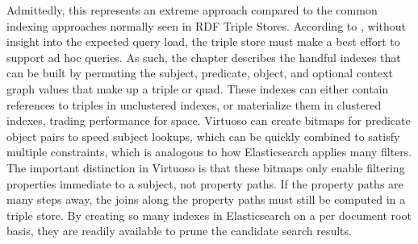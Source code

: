 Admittedly, this represents an extreme approach compared to the common indexing approaches normally seen in RDF Triple Stores.  
According to \cite{luo2012storing}, without insight into the expected query load, the triple store must make a best effort to support ad hoc queries.  
As such, the chapter describes the handful indexes that can be built by permuting the subject, predicate, object, and optional context graph values that make up a triple or quad.
These indexes can either contain references to triples in unclustered indexes, or materialize them in clustered indexes, trading performance for space.
Virtuoso can create bitmaps for predicate object pairs to speed subject lookups, which can be quickly combined to satisfy multiple constraints, which is analogous to how Elasticsearch applies many filters. 
The important distinction in Virtuoso is that these bitmaps only enable filtering properties immediate to a subject, not property paths.
If the property paths are many steps away, the joins along the property paths must still be computed in a triple store.
By creating so many indexes in Elasticsearch on a per document root basis, they are readily available to prune the candidate search results.



 